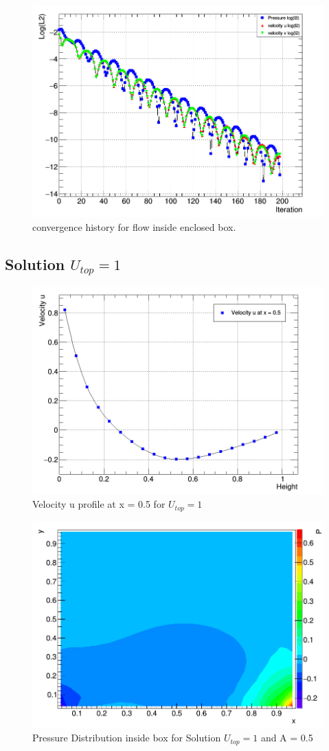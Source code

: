 \documentclass[paper=a4, fontsize=11pt, abstract=on]{scrartcl}
\numberwithin{equation}{section}		%
\numberwithin{figure}{section}			%
\numberwithin{table}{section}				%
\begin{document}
\begin{figure}[H]
\centering
\includegraphics[width=0.80\linewidth]{stabord}
\caption{convergence history for flow inside enclosed box. }
\label{con}
\end{figure}

\subsection{Solution $U_{top} = 1$}

\begin{figure}[H]
\centering
\includegraphics[width=0.80\linewidth]{con1}
\caption{Velocity u profile at x = 0.5 for $U_{top}=1$ }
\label{con}
\end{figure}

\begin{figure}[H]
\centering
\includegraphics[width=0.80\linewidth]{con2}
\caption{Pressure Distribution inside box for Solution $U_{top}=1$ and A = 0.5}
\label{con}
\end{figure}
\end{document}
